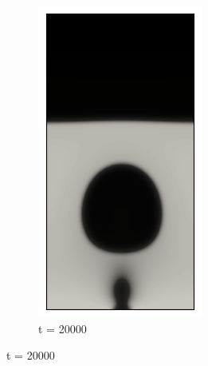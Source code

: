 \begin{figure}[h!]
\begin{subfigure}{0.25\textwidth}
		\includegraphics[width=\linewidth]{figs/cap4/bubble_20}
		\caption{t = 20000}
		\label{fig:3}
	\end{subfigure}
	

\end{figure}
